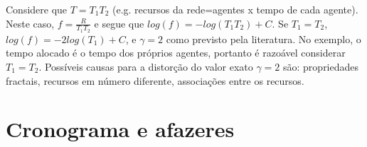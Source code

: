 \documentclass[a4paper,openright,12pt]{report} %
\begin{document}
Considere que $T=T_1 T_2$ 
(e.g. recursos da rede=agentes x tempo de cada agente). 
Neste caso,
$f=\frac{R}{T_1 T_2}$ e
segue que $log(f)=-log(T_1 T_2) +C$. Se $T_1=T_2$, 
$log(f)=-2 log(T_1) + C$, e
$\gamma=2$ como previsto pela literatura.
No exemplo, o tempo alocado
é o tempo dos próprios agentes,
portanto é razoável considerar $T_1=T_2$. 
Possíveis causas para a distorção do valor exato $\gamma=2$
são: propriedades fractais, recursos em número diferente, associações entre os recursos. 

\chapter{Cronograma e afazeres}\label{sec:chr}
\end{document}
